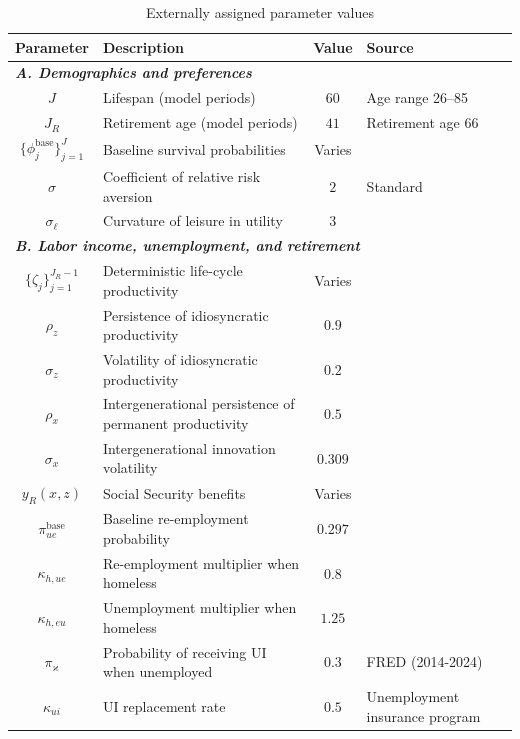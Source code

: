 \begin{table}[p]
\footnotesize
\renewcommand{\arraystretch}{1.25}
\begin{center}
\caption{Externally assigned parameter values}
\label{tab:external_calibration}
\begin{tabular}{clcl}
\toprule
\textbf{Parameter} & \textbf{Description} & \textbf{Value} & \textbf{Source} \\
\midrule
\multicolumn{4}{l}{\textit{\textbf{A. Demographics and preferences}}} \\
\midrule
$J$ & Lifespan (model periods) & $60$ & Age range 26--85 \\
$J_R$ & Retirement age (model periods) & $41$ & Retirement age 66 \\
$\{\phi^{\text{base}}_j\}_{j=1}^J$ & Baseline survival probabilities & Varies & \citet{arias-2014} \\
$\sigma$ & Coefficient of relative risk aversion & $2$ & Standard \\
$\sigma_{\ell}$ & Curvature of leisure in utility & $3$ & \citet{Chetty2012Frisch} \\
\midrule
\multicolumn{4}{l}{\textit{\textbf{B. Labor income, unemployment, and retirement}}} \\
\midrule
$\{\zeta_j\}_{j=1}^{J_R-1}$ & Deterministic life-cycle productivity & Varies & \citet{gkkoc} \\
$\rho_z$ & Persistence of idiosyncratic productivity & $0.9$ & \citet{gkkoc} \\
$\sigma_z$ & Volatility of idiosyncratic productivity & $0.2$ & \citet{gkkoc} \\
$\rho_x$ & Intergenerational persistence of permanent productivity & $0.5$ & \citet{gkkoc} \\
$\sigma_x$ & Intergenerational innovation volatility & $0.309$ & \citet{gkkoc} \\
$y_R(x,z)$ & Social Security benefits & Varies & \citet{gkkoc} \\
$\pi^{\text{base}}_{ue}$ & Baseline re-employment probability & $0.297$ & \citet{kruegeretal-2016} \\
$\kappa_{h,ue}$ & Re-employment multiplier when homeless & $0.8$ & \citet{desmond_gershenson_2016} \\
$\kappa_{h,eu}$ & Unemployment multiplier when homeless & $1.25$ & \citet{desmond_gershenson_2016} \\
$\pi_\varkappa$ & Probability of receiving UI when unemployed & $0.3$ & FRED (2014-2024) \\
$\kappa_{ui}$ & UI replacement rate & $0.5$ & Unemployment insurance program \\

\end{tabular}
\end{center}
\end{table}
